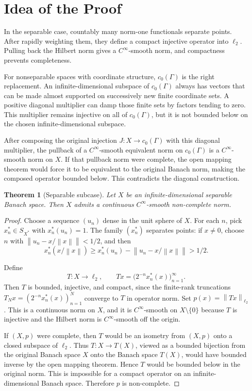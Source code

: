 \documentclass[11pt]{article}
\newtheorem{theorem}{Theorem}
\theoremstyle{definition}
\newcommand{\norm}[1]{\left\lVert #1 \right\rVert}
\begin{document}
\section*{Idea of the Proof}

In the separable case, countably many norm-one functionals separate points.
After rapidly weighting them, they define a compact injective operator into
\(\ell_2\).  Pulling back the Hilbert norm gives a \(C^\infty\)-smooth norm,
and compactness prevents completeness.

For nonseparable spaces with coordinate structure, \(c_0(\Gamma)\) is the
right replacement.  An infinite-dimensional subspace of \(c_0(\Gamma)\) always
has vectors that can be made almost supported on successively new finite
coordinate sets.  A positive diagonal multiplier can damp those finite sets by
factors tending to zero.  This multiplier remains injective on all of
\(c_0(\Gamma)\), but it is not bounded below on the chosen infinite-dimensional
subspace.

After composing the original injection \(J:X\to c_0(\Gamma)\) with this
diagonal multiplier, the pullback of a \(C^\infty\)-smooth equivalent norm on
\(c_0(\Gamma)\) is a \(C^\infty\)-smooth norm on \(X\).  If that pullback norm
were complete, the open mapping theorem would force it to be equivalent to the
original Banach norm, making the composed operator bounded below.  This
contradicts the diagonal construction.

\begin{theorem}[Separable subcase]
\label{thm:separable}
Let \(X\) be an infinite-dimensional separable Banach space.  Then \(X\)
admits a continuous \(C^\infty\)-smooth non-complete norm.
\end{theorem}

\begin{proof}
Choose a sequence \((u_n)\) dense in the unit sphere of \(X\).  For each
\(n\), pick \(x_n^*\in S_{X^*}\) with \(x_n^*(u_n)=1\).  The family
\((x_n^*)\) separates points: if \(x\neq0\), choose \(n\) with
\(\norm{u_n-x/\norm{x}}<1/2\), and then
\[
    x_n^*(x/\norm{x})\geq x_n^*(u_n)-\norm{u_n-x/\norm{x}}>1/2.
\]

Define
\[
    T:X\longrightarrow \ell_2,\qquad
    Tx=\bigl(2^{-n}x_n^*(x)\bigr)_{n=1}^{\infty}.
\]
Then \(T\) is bounded, injective, and compact, since the finite-rank
truncations \(T_Nx=(2^{-n}x_n^*(x))_{n=1}^N\) converge to \(T\) in operator
norm.  Set \(p(x)=\norm{Tx}_{\ell_2}\).  This is a continuous norm on \(X\),
and it is \(C^\infty\)-smooth on \(X\setminus\{0\}\) because \(T\) is
injective and the Hilbert norm is \(C^\infty\)-smooth off the origin.

If \((X,p)\) were complete, then \(T\) would be an isometry from \((X,p)\)
onto a closed subspace of \(\ell_2\).  Thus \(T:X\to T(X)\), viewed as a
bounded bijection from the original Banach space \(X\) onto the Banach space
\(T(X)\), would have bounded inverse by the open mapping theorem.  Hence \(T\)
would be bounded below in the original norm.  This is impossible for a compact
operator on an infinite-dimensional Banach space.  Therefore \(p\) is
non-complete.
\end{proof}
\end{document}
